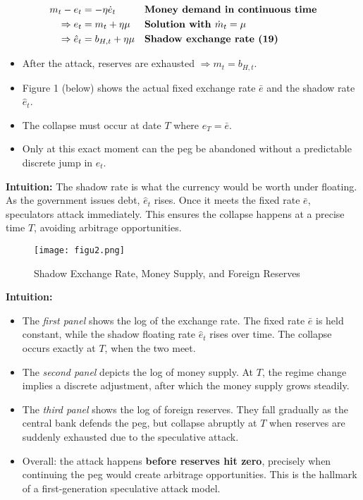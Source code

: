 \documentclass[12pt]{article}
\begin{document}
\singlespacing
\begin{align}
m_t - e_t &= -\eta \dot e_t && \text{\textbf{Money demand in continuous time}} \\
\Rightarrow e_t &= m_t + \eta \mu && \text{\textbf{Solution with $\dot m_t = \mu$}} \\
\Rightarrow \hat e_t &= b_{H,t} + \eta \mu && \text{\textbf{Shadow exchange rate (19)}}
\end{align}

\begin{itemize}
    \item After the attack, reserves are exhausted $\Rightarrow m_t = b_{H,t}$.
    \item Figure 1 (below) shows the actual fixed exchange rate $\bar e$ and the shadow rate $\hat e_t$.
    \item The collapse must occur at date $T$ where $\hat e_T = \bar e$.
    \item Only at this exact moment can the peg be abandoned without a predictable discrete jump in $e_t$.
\end{itemize}

\noindent\textbf{Intuition:}  
The shadow rate is what the currency would be worth under floating. As the government issues debt, $\hat e_t$ rises. Once it meets the fixed rate $\bar e$, speculators attack immediately. This ensures the collapse happens at a precise time $T$, avoiding arbitrage opportunities.

\begin{figure}[H]
    \centering
    \texttt{[image: figu2.png]}
    \caption{Shadow Exchange Rate, Money Supply, and Foreign Reserves}
    \label{fig:figu2}
\end{figure}

\noindent\textbf{Intuition:}
\begin{itemize}
    \item The \textit{first panel} shows the log of the exchange rate. The fixed rate $\bar e$ is held constant, while the shadow floating rate $\hat e_t$ rises over time. The collapse occurs exactly at $T$, when the two meet.
    \item The \textit{second panel} depicts the log of money supply. At $T$, the regime change implies a discrete adjustment, after which the money supply grows steadily.
    \item The \textit{third panel} shows the log of foreign reserves. They fall gradually as the central bank defends the peg, but collapse abruptly at $T$ when reserves are suddenly exhausted due to the speculative attack.
    \item Overall: the attack happens \textbf{before reserves hit zero}, precisely when continuing the peg would create arbitrage opportunities. This is the hallmark of a first-generation speculative attack model.
\end{itemize}
\end{document}
